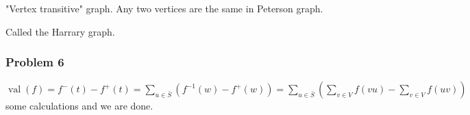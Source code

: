 \documentclass[11pt]{article}
\def\val{\operatorname{val}}
\begin{document}
"Vertex transitive" graph. Any two vertices are the same in Peterson graph.

Called the Harrary graph.
\subsubsection{Problem 6}
\label{sec:orgdbb488e}
\(\val(f) = f^-(t) - f^{+}(t) = \sum_{u \in \bar{S}} (f^{-1}(w) - f^{+}(w)) =
    \sum_{u\in \bar{S}}(\sum_{v \in V} f(vu) - \sum_{v \in V} f(uv))\) some
calculations and we are done.
\end{document}
